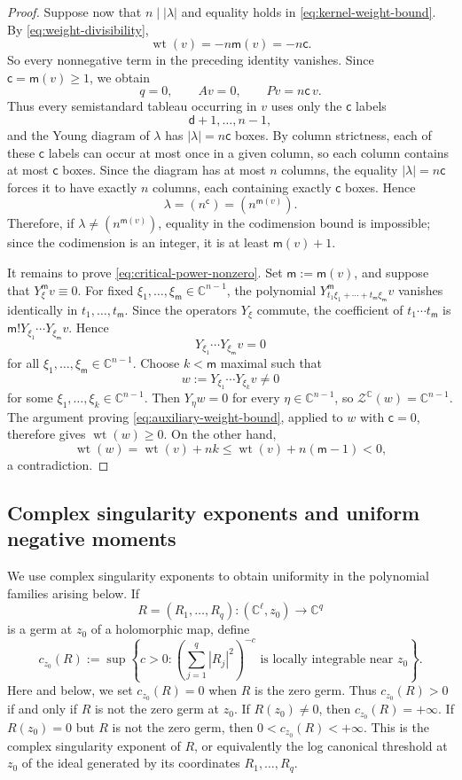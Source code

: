 \documentclass[reqno,11pt]{amsart}
\numberwithin{equation}{section}
\theoremstyle{definition}
\theoremstyle{remark}
\begin{document}
\begin{proof}
Suppose now that $n\mid|\lambda|$ and equality holds in
\eqref{eq:kernel-weight-bound}. By
\eqref{eq:weight-divisibility},
$$
\operatorname{wt}(v)
=
-n\mathsf m(v)
=
-n\mathsf c.
$$
 So every
nonnegative term in the preceding identity vanishes. Since
$\mathsf c=\mathsf m(v)\ge1$, we obtain
$$
q=0,\qquad Av=0,\qquad Pv=n\mathsf c\,v.
$$
Thus every semistandard tableau occurring in $v$ uses only the
$\mathsf c$ labels
$$
\mathsf d+1,\ldots,n-1,
$$
and the Young diagram of $\lambda$ has
$|\lambda|=n\mathsf c$
boxes. By column strictness, each of these $\mathsf c$ labels can occur at
most once in a given column, so each column contains at most $\mathsf c$
boxes. Since the diagram has at most $n$ columns, the equality
$|\lambda|=n\mathsf c$ forces it to have exactly $n$ columns, each
containing exactly $\mathsf c$ boxes. Hence
$$
\lambda=(n^{\mathsf c})=(n^{\mathsf m(v)}).
$$
Therefore, if $\lambda\ne(n^{\mathsf m(v)})$, equality in the codimension
bound is impossible; since the codimension is an integer, it is at least
$\mathsf m(v)+1$.

It remains to prove \eqref{eq:critical-power-nonzero}. Set
$\mathsf m:=\mathsf m(v)$, and suppose that $Y_\xi^{\mathsf m}v\equiv0$.
For fixed $\xi_1,\ldots,\xi_{\mathsf m}\in\mathbb C^{n-1}$, the polynomial
$Y_{t_1\xi_1+\cdots+t_{\mathsf m}\xi_{\mathsf m}}^{\mathsf m}v$ vanishes
identically in $t_1,\ldots,t_{\mathsf m}$. Since the operators $Y_\xi$
commute, the coefficient of $t_1\cdots t_{\mathsf m}$ is
$\mathsf m!Y_{\xi_1}\cdots Y_{\xi_{\mathsf m}}v$. Hence
$$
Y_{\xi_1}\cdots Y_{\xi_{\mathsf m}}v=0
$$
for all $\xi_1,\ldots,\xi_{\mathsf m}\in\mathbb C^{n-1}$. Choose $k<\mathsf m$
maximal such that
$$
w:=Y_{\xi_1}\cdots Y_{\xi_k}v\ne0
$$
for some $\xi_1,\ldots,\xi_k\in\mathbb C^{n-1}$. Then $Y_\eta w=0$ for every
$\eta\in\mathbb C^{n-1}$, so
$
\mathcal Z^{\mathbb C}(w)=\mathbb C^{n-1}.
$
The argument proving \eqref{eq:auxiliary-weight-bound}, applied to $w$
with $\mathsf c=0$, therefore gives
$\operatorname{wt}(w)\ge0$.
On the other hand,
$$
\operatorname{wt}(w)
=
\operatorname{wt}(v)+nk
\le
\operatorname{wt}(v)+n(\mathsf m-1)
<0,
$$
a contradiction.
\end{proof}


\subsection{Complex singularity exponents and uniform negative moments}
\label{s:analytic-stability}

We use complex singularity exponents to obtain uniformity in the polynomial
families arising below. If
$$
R=(R_1,\ldots,R_q):(\mathbb C^\ell,z_0)\to\mathbb C^q
$$
is a germ at $z_0$ of a holomorphic map, define
$$
{c}_{z_0}(R)
:=
\sup\left\{c>0:
\left(\sum_{j=1}^q|R_j|^2\right)^{-c}
\text{ is locally integrable near }z_0
\right\}.
$$
Here and below, we set $c_{z_0}(R)=0$ when $R$ is the zero germ. Thus
$c_{z_0}(R)>0$ if and only if $R$ is not the zero germ at $z_0$.
If $R(z_0)\ne 0$, then ${c}_{z_0}(R)=+\infty$. If $R(z_0)=0$ but $R$ is not the zero germ, then $0<c_{z_0}(R)<+\infty$.
This is the complex singularity exponent of $R$, or equivalently the
log canonical threshold at $z_0$ of the ideal generated by its coordinates $R_1,\ldots,R_q$.
\end{document}

